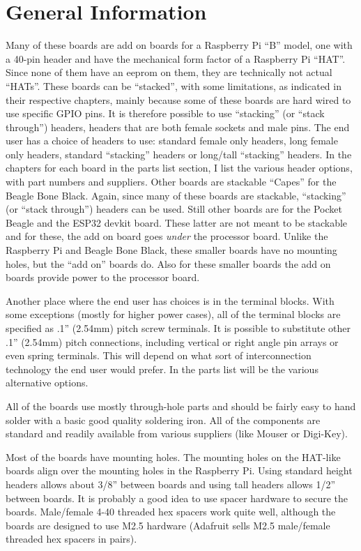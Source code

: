 \documentclass[12pt,notitlepage,twoside]{book}
\begin{document}
\cleardoublepage
{}
\chapter{General Information}

Many of these boards are add on boards for a Raspberry Pi ``B'' model, 
one with a 40-pin header and have the mechanical form factor of a Raspberry Pi 
``HAT''.  Since none of them have an eeprom on them, they are technically not 
actual ``HATs''.  These boards can be ``stacked'', with some limitations, as 
indicated in their respective chapters, mainly because some of these boards 
are hard wired to use specific GPIO pins.  It is therefore possible to use 
``stacking'' (or ``stack through'') headers, headers that are both female 
sockets and male pins.  The end user has a choice of headers to use: standard 
female only headers, long female only headers, standard ``stacking'' headers 
or long/tall ``stacking'' headers.  In the chapters for each board in the 
parts list section, I list the various header options, with part numbers and 
suppliers.  Other boards are stackable ``Capes'' for the Beagle Bone Black. 
Again, since many of these boards are stackable, ``stacking'' (or ``stack 
through'') headers can be used.  Still other boards are for the Pocket Beagle 
and the ESP32 devkit board.  These latter are not meant to be stackable and 
for these, the add on board goes \textit{under} the processor board.  Unlike 
the Raspberry Pi and Beagle Bone Black, these smaller boards have no mounting 
holes, but the ``add on'' boards do.  Also for these smaller boards the add 
on boards provide power to the processor board.

Another place where the end user has choices is in the terminal blocks.  With 
some exceptions (mostly for higher power cases), all of the terminal blocks 
are specified as .1'' (2.54mm) pitch screw terminals.  It is possible to 
substitute other .1'' (2.54mm) pitch connections, including vertical or right 
angle pin arrays or even spring terminals.  This will depend on what sort of 
interconnection technology the end user would prefer.  In the parts list will 
be the various alternative options.

All of the boards use mostly through-hole parts and should be fairly easy to
hand solder with a basic good quality soldering iron. All of the components
are standard and readily available from various suppliers (like Mouser or
Digi-Key).

Most of the boards have mounting holes.  The mounting holes on the HAT-like 
boards align over the mounting holes in the Raspberry Pi.  Using standard 
height headers allows about 3/8'' between boards and using tall headers allows 
1/2'' between boards.  It is probably a good idea to use spacer hardware to 
secure the boards.  Male/female 4-40 threaded hex spacers work quite well, 
although the boards are designed to use M2.5 hardware (Adafruit sells M2.5 
male/female threaded hex spacers in pairs).
\end{document}

